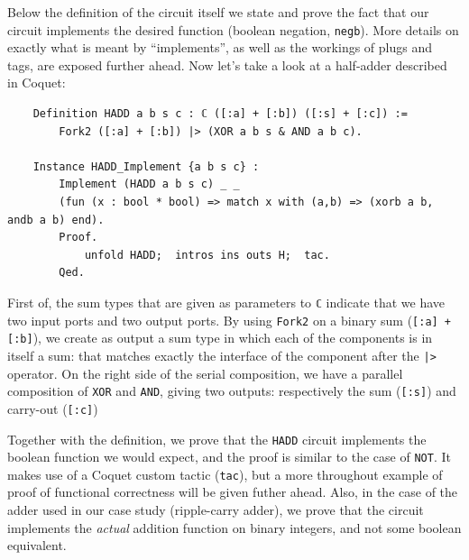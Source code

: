 \documentclass[a4paper]{article}
\begin{document}
                Below the definition of the circuit itself we state and prove the fact that our
                circuit implements the desired function (boolean negation, \texttt{negb}). More
                details on exactly what is meant by ``implements'', as well as the workings of plugs
                and tags, are exposed further ahead. Now let's take a look at a half-adder
                described in Coquet:
                \begin{verbatim}
    Definition HADD a b s c : ℂ ([:a] + [:b]) ([:s] + [:c]) :=
        Fork2 ([:a] + [:b]) |> (XOR a b s & AND a b c).

    Instance HADD_Implement {a b s c} :
        Implement (HADD a b s c) _ _
        (fun (x : bool * bool) => match x with (a,b) => (xorb a b, andb a b) end).
        Proof.
            unfold HADD;  intros ins outs H;  tac.
        Qed.
                \end{verbatim}

                First of, the sum types that are given as parameters to \texttt{ℂ} indicate that we
                have two input ports and two output ports. By using \texttt{Fork2} on a binary sum
                (\texttt{[:a] + [:b]}), we create as output a sum type in which each of the
                components is in itself a sum: that matches exactly the interface of the component
                after the \texttt{|>} operator. On the right side of the serial composition, we have
                a parallel composition of \texttt{XOR} and \texttt{AND}, giving two outputs:
                respectively the sum (\texttt{[:s]}) and carry-out (\texttt{[:c]}) 

                Together with the definition, we prove that the \texttt{HADD} circuit implements the
                boolean function we would expect, and the proof is similar to the case of
                \texttt{NOT}. It makes use of a Coquet custom tactic (\texttt{tac}), but a more
                throughout example of proof of functional correctness will be given futher ahead.
                Also, in the case of the adder used in our case study (ripple-carry adder), we prove
                that the circuit implements the \emph{actual} addition function on binary integers,
                and not some boolean equivalent.
\end{document}
